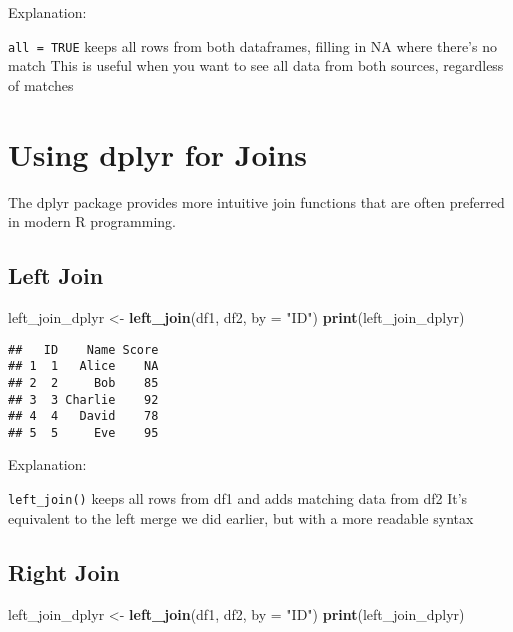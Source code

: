 \documentclass[
]{article}
\newenvironment{Shaded}{\begin{snugshade}}{\end{snugshade}}
\newcommand{\AttributeTok}[1]{\textcolor[rgb]{0.13,0.29,0.53}{#1}}
\newcommand{\FunctionTok}[1]{\textcolor[rgb]{0.13,0.29,0.53}{\textbf{#1}}}
\newcommand{\NormalTok}[1]{#1}
\newcommand{\OtherTok}[1]{\textcolor[rgb]{0.56,0.35,0.01}{#1}}
\newcommand{\StringTok}[1]{\textcolor[rgb]{0.31,0.60,0.02}{#1}}
\begin{document}
Explanation:

\texttt{all\ =\ TRUE} keeps all rows from both dataframes, filling in NA
where there's no match This is useful when you want to see all data from
both sources, regardless of matches

\hypertarget{using-dplyr-for-joins}{%
\section{Using dplyr for Joins}\label{using-dplyr-for-joins}}

The dplyr package provides more intuitive join functions that are often
preferred in modern R programming.

\hypertarget{left-join-1}{%
\subsection{Left Join}\label{left-join-1}}

\begin{Shaded}
\begin{Highlighting}[]
\NormalTok{left\_join\_dplyr }\OtherTok{\textless{}{-}} \FunctionTok{left\_join}\NormalTok{(df1, df2, }\AttributeTok{by =} \StringTok{"ID"}\NormalTok{)}
\FunctionTok{print}\NormalTok{(left\_join\_dplyr)}
\end{Highlighting}
\end{Shaded}

\begin{verbatim}
##   ID    Name Score
## 1  1   Alice    NA
## 2  2     Bob    85
## 3  3 Charlie    92
## 4  4   David    78
## 5  5     Eve    95
\end{verbatim}

Explanation:

\texttt{left\_join()} keeps all rows from df1 and adds matching data
from df2 It's equivalent to the left merge we did earlier, but with a
more readable syntax

\hypertarget{right-join-1}{%
\subsection{Right Join}\label{right-join-1}}

\begin{Shaded}
\begin{Highlighting}[]
\NormalTok{left\_join\_dplyr }\OtherTok{\textless{}{-}} \FunctionTok{left\_join}\NormalTok{(df1, df2, }\AttributeTok{by =} \StringTok{"ID"}\NormalTok{)}
\FunctionTok{print}\NormalTok{(left\_join\_dplyr)}
\end{Highlighting}
\end{Shaded}
\end{document}
